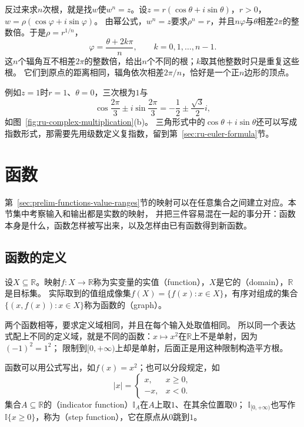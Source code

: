 反过来求$n$次根，就是找$w$使$w^n=z$。设$z=r(\cos\theta+i\sin\theta)$，$r>0$，$w=\rho(\cos\varphi+i\sin\varphi)$。
由幂公式，$w^n=z$要求$\rho^n=r$，并且$n\varphi$与$\theta$相差$2\pi$的整数倍。于是$\rho=r^{1/n}$，
\begin{equation}
 \varphi=\frac{\theta+2k\pi}{n},\qquad k=0,1,\ldots,n-1.
 \label{eq:ru-complex-roots}
\end{equation}
这$n$个辐角互不相差$2\pi$的整数倍，给出$n$个不同的根；$k$取其他整数时只是重复这些根。
它们到原点的距离相同，辐角依次相差$2\pi/n$，恰好是一个正$n$边形的顶点。

例如$z=1$时$r=1$、$\theta=0$，三次根为$1$与
\[
 \cos\frac{2\pi}3\pm i\sin\frac{2\pi}3=-\frac12\pm\frac{\sqrt3}2i,
\]
如图~\ref{fig:ru-complex-multiplication}(b)。
三角形式中的$\cos\theta+i\sin\theta$还可以写成指数形式，那需要先用级数定义复指数，留到第~\ref{sec:ru-euler-formula}节。
\section{函数}
\label{sec:ru-functions}

第~\ref{sec:prelim-functions-value-ranges}节的映射可以在任意集合之间建立对应。本节集中考察输入和输出都是实数的映射，
并把三件容易混在一起的事分开：函数本身是什么，函数怎样被写出来，以及怎样由已有函数得到新函数。

\subsection{函数的定义}
\label{sec:ru-function-definition}

设$X\subseteq\mathbb R$。映射$f:X\to\mathbb R$称为实变量的实值（function），$X$是它的（domain），$\mathbb R$是目标集。
实际取到的值组成像集$f(X)=\{f(x):x\in X\}$，有序对组成的集合$\{(x,f(x)):x\in X\}$称为函数的（graph）。

两个函数相等，要求定义域相同，并且在每个输入处取值相同。
所以同一个表达式配上不同的定义域，就是不同的函数：$x\mapsto x^2$在$\mathbb R$上不是单射，因为$(-1)^2=1^2$；
限制到$[0,+\infty)$上却是单射，后面正是用这种限制构造平方根。

函数可以用公式写出，如$f(x)=x^2$；也可以分段规定，如
\[
 |x|=\begin{cases}x,&x\geq0,\\-x,&x<0.\end{cases}
\]
集合$A\subseteq\mathbb R$的（indicator function）$\mathbb I_A$在$A$上取$1$、在其余位置取$0$；
$\mathbb I_{[0,+\infty)}$也写作$\mathbb I\{x\geq0\}$，称为（step function），它在原点从$0$跳到$1$。

